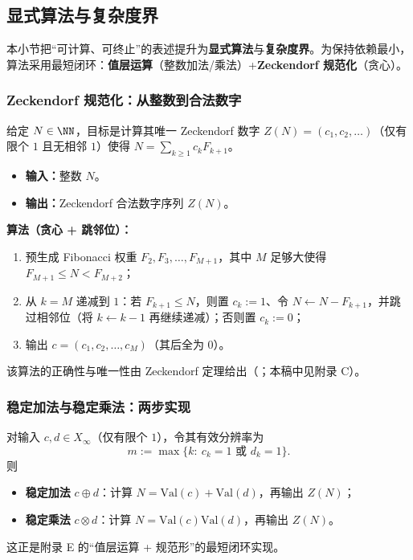 \subsection{显式算法与复杂度界}\label{subsec:zeckendorf-algorithms-complexity}

本小节把“可计算、可终止”的表述提升为\textbf{显式算法}与\textbf{复杂度界}。为保持依赖最小，算法采用最短闭环：\textbf{值层运算}（整数加法/乘法）+\textbf{Zeckendorf 规范化}（贪心）。

\subsubsection{Zeckendorf 规范化：从整数到合法数字}

给定 $N\in\NN$，目标是计算其唯一 Zeckendorf 数字 $Z(N)=(c_1,c_2,\dots)$（仅有限个 $1$ 且无相邻 $1$）使得 $N=\sum_{k\ge 1}c_kF_{k+1}$。

\begin{itemize}
  \item \textbf{输入：}整数 $N$。
  \item \textbf{输出：}Zeckendorf 合法数字序列 $Z(N)$。
\end{itemize}

\textbf{算法（贪心 + 跳邻位）：}
\begin{enumerate}
  \item 预生成 Fibonacci 权重 $F_{2},F_{3},\dots,F_{M+1}$，其中 $M$ 足够大使得 $F_{M+1}\le N<F_{M+2}$；
  \item 从 $k=M$ 递减到 $1$：若 $F_{k+1}\le N$，则置 $c_k:=1$、令 $N\leftarrow N-F_{k+1}$，并跳过相邻位（将 $k\leftarrow k-1$ 再继续递减）；否则置 $c_k:=0$；
  \item 输出 $c=(c_1,c_2,\dots,c_M)$（其后全为 $0$）。
\end{enumerate}

该算法的正确性与唯一性由 Zeckendorf 定理给出（\cite{Zeckendorf1972}；本稿中见附录 C）。

\subsubsection{稳定加法与稳定乘法：两步实现}

对输入 $c,d\in X_\infty$（仅有限个 $1$），令其有效分辨率为
\[
m:=\max\{k:\ c_k=1\text{ 或 }d_k=1\}.
\]
则
\begin{itemize}
  \item \textbf{稳定加法} $c\oplus d$：计算 $N=\mathrm{Val}(c)+\mathrm{Val}(d)$，再输出 $Z(N)$；
  \item \textbf{稳定乘法} $c\otimes d$：计算 $N=\mathrm{Val}(c)\mathrm{Val}(d)$，再输出 $Z(N)$。
\end{itemize}
这正是附录 E 的“值层运算 + 规范形”的最短闭环实现。

